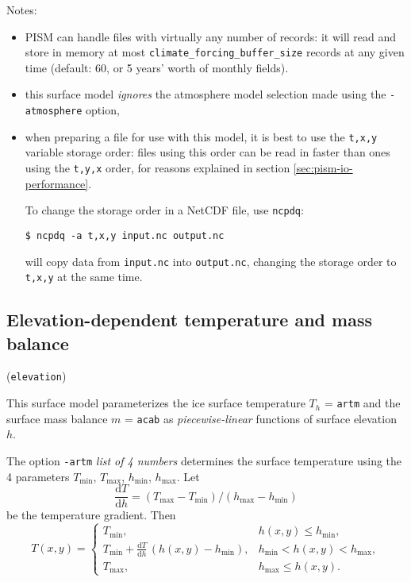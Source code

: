 \documentclass[titlepage,letterpaper,final]{scrartcl}
\newcommand{\txtopt}[2]{\texttt{-#1} #2\optindex{\texttt{-#1} #2}}
\begin{document}
\noindent Notes:
\begin{itemize}
\item PISM can handle files with virtually any number of records: it will
  read and store in memory at most \texttt{climate_forcing_buffer_size} records
  at any given time (default: 60, or 5 years' worth of monthly fields).
\item this surface model \emph{ignores} the atmosphere model selection made
  using the \texttt{-atmosphere} option,
\item when preparing a file for use with this model, it is best to use the \texttt{t,x,y} variable storage order: files using this order can be read in faster than ones using the \texttt{t,y,x} order, for reasons explained in section \ref{sec:pism-io-performance}.

  To change the storage order in a NetCDF file, use \texttt{ncpdq}:
\begin{verbatim}
$ ncpdq -a t,x,y input.nc output.nc
\end{verbatim}%
  will copy data from \texttt{input.nc} into \texttt{output.nc}, changing the storage order to \texttt{t,x,y} at the same time.
\end{itemize}

\subsection{Elevation-dependent temperature and mass balance}
\label{sec:surface-elev-depend-temp}

(\texttt{elevation})

\newcommand{\var}[2]{ {#1}_{\text{#2}} }
\newcommand{\h}[1]{ \var{h}{#1} }
\newcommand{\T}[1]{ \var{T}{#1} }
\newcommand{\m}[1]{ \var{m}{#1} }
\newcommand{\ms}[1]{ \var{m^{*}}{#1} }
\newcommand{\diff}[2]{ \frac{\mathrm{d}#1}{\mathrm{d}#2} }

This surface model parameterizes the ice surface temperature $T_{h}$ = \texttt{artm} and the surface mass balance $m$ = \texttt{acab} as \emph{piecewise-linear} functions of surface elevation $h$.

The option \txtopt{artm}{\emph{list of 4 numbers}} determines the surface temperature using the 4 parameters $\T{min}$, $\T{max}$, $\h{min}$, $\h{max}$. Let
\begin{equation}
  \diff{T}{h} = (\T{max} - \T{min}) / (\h{max} - \h{min})
\end{equation}
be the temperature gradient. Then
\begin{equation}
  T(x,y) =
  \begin{cases}
    \T{min}, & h(x,y) \le \h{min}, \\
    \T{min} + \diff{T}{h} \, (h(x,y) - \h{min}), & \h{min} < h(x,y) < \h{max}, \\
    \T{max}, & \h{max} \le h(x,y).
  \end{cases}
\end{equation}
\end{document}
